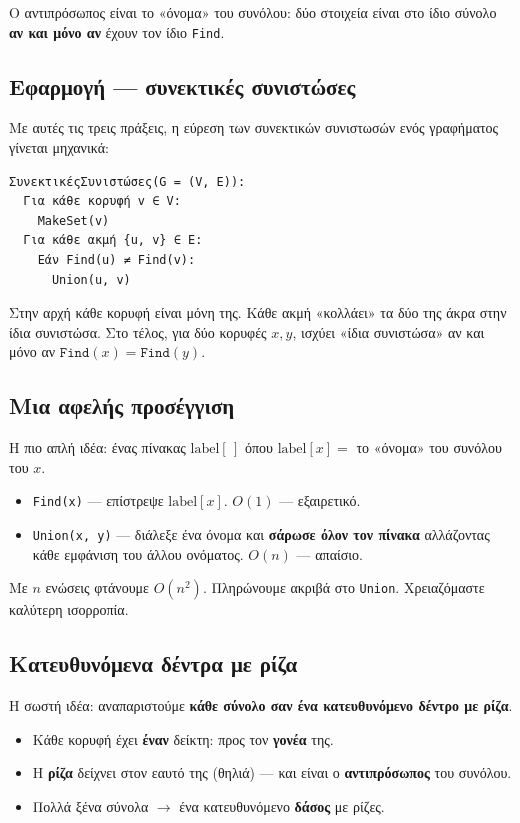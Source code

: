 \documentclass[11pt,a4paper]{article}
\begin{document}
Ο αντιπρόσωπος είναι το «όνομα» του συνόλου: δύο στοιχεία είναι στο ίδιο σύνολο
\textbf{αν και μόνο αν} έχουν τον ίδιο \texttt{Find}.

\subsection{Εφαρμογή --- συνεκτικές συνιστώσες}

Με αυτές τις τρεις πράξεις, η εύρεση των συνεκτικών συνιστωσών ενός γραφήματος
γίνεται μηχανικά:

\begin{codebox}
\begin{verbatim}
ΣυνεκτικέςΣυνιστώσες(G = (V, E)):
  Για κάθε κορυφή v ∈ V:
    MakeSet(v)
  Για κάθε ακμή {u, v} ∈ E:
    Εάν Find(u) ≠ Find(v):
      Union(u, v)
\end{verbatim}
\end{codebox}

Στην αρχή κάθε κορυφή είναι μόνη της. Κάθε ακμή «κολλάει» τα δύο της άκρα στην
ίδια συνιστώσα. Στο τέλος, για δύο κορυφές $x, y$, ισχύει «ίδια συνιστώσα» αν και
μόνο αν $\texttt{Find}(x) = \texttt{Find}(y)$.

\subsection{Μια αφελής προσέγγιση}

Η πιο απλή ιδέα: ένας πίνακας $\text{label}[\,]$ όπου $\text{label}[x] = $ το
«όνομα» του συνόλου του $x$.
\begin{itemize}
  \item \texttt{Find(x)} --- επίστρεψε $\text{label}[x]$. \textbf{$O(1)$} ---
  εξαιρετικό.
  \item \texttt{Union(x, y)} --- διάλεξε ένα όνομα και \textbf{σάρωσε όλον τον
  πίνακα} αλλάζοντας κάθε εμφάνιση του άλλου ονόματος. \textbf{$O(n)$} ---
  απαίσιο.
\end{itemize}
Με $n$ ενώσεις φτάνουμε $O(n^2)$. Πληρώνουμε ακριβά στο \texttt{Union}.
Χρειαζόμαστε καλύτερη ισορροπία.

\subsection{Κατευθυνόμενα δέντρα με ρίζα}

Η σωστή ιδέα: αναπαριστούμε \textbf{κάθε σύνολο σαν ένα κατευθυνόμενο δέντρο με
ρίζα}.
\begin{itemize}
  \item Κάθε κορυφή έχει \textbf{έναν} δείκτη: προς τον \textbf{γονέα} της.
  \item Η \textbf{ρίζα} δείχνει στον εαυτό της (θηλιά) --- και είναι ο
  \textbf{αντιπρόσωπος} του συνόλου.
  \item Πολλά ξένα σύνολα $\to$ ένα κατευθυνόμενο \textbf{δάσος} με ρίζες.
\end{itemize}
\end{document}
